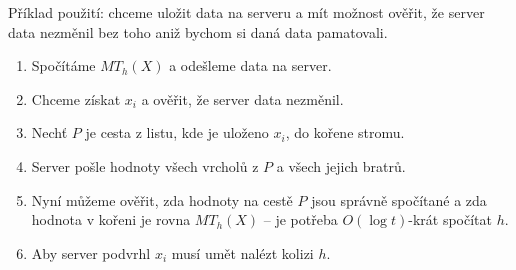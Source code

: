 \documentclass{article}
\begin{document}
Příklad použití: chceme uložit data na serveru a mít možnost ověřit, že server data nezměnil bez toho aniž bychom si daná data pamatovali.
\begin{enumerate}
\item Spočítáme $MT_h(X)$ a odešleme data na server.
\item Chceme získat $x_i$ a ověřit, že server data nezměnil.
\item Nechť $P$ je cesta z listu, kde je uloženo $x_i$, do kořene stromu.
\item Server pošle hodnoty všech vrcholů z $P$ a všech jejich bratrů.
\item Nyní můžeme ověřit, zda hodnoty na cestě $P$ jsou správně spočítané a zda hodnota v kořeni je rovna $MT_h(X)$ -- je potřeba $O(\log t)$-krát spočítat $h$.
\item Aby server podvrhl $x_i$ musí umět nalézt kolizi $h$.
\end{enumerate}
\end{document}
